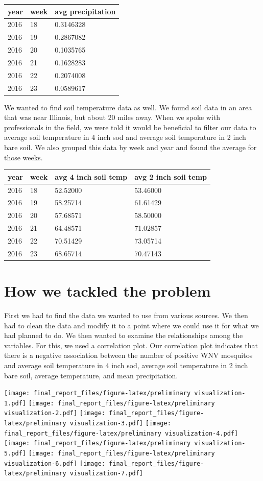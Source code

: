 \documentclass[]{article}
\begin{document}
\begin{longtable}[]{@{}lll@{}}
\toprule
year & week & avg precipitation\tabularnewline
\midrule
\endhead
2016 & 18 & 0.3146328\tabularnewline
2016 & 19 & 0.2867082\tabularnewline
2016 & 20 & 0.1035765\tabularnewline
2016 & 21 & 0.1628283\tabularnewline
2016 & 22 & 0.2074008\tabularnewline
2016 & 23 & 0.0589617\tabularnewline
\bottomrule
\end{longtable}

We wanted to find soil temperature data as well. We found soil data in
an area that was near Illinois, but about 20 miles away. When we spoke
with professionals in the field, we were told it would be beneficial to
filter our data to average soil temperature in 4 inch sod and average
soil temperature in 2 inch bare soil. We also grouped this data by week
and year and found the average for those weeks.

\begin{longtable}[]{@{}llll@{}}
\toprule
year & week & avg 4 inch soil temp & avg 2 inch soil temp\tabularnewline
\midrule
\endhead
2016 & 18 & 52.52000 & 53.46000\tabularnewline
2016 & 19 & 58.25714 & 61.61429\tabularnewline
2016 & 20 & 57.68571 & 58.50000\tabularnewline
2016 & 21 & 64.48571 & 71.02857\tabularnewline
2016 & 22 & 70.51429 & 73.05714\tabularnewline
2016 & 23 & 68.65714 & 70.47143\tabularnewline
\bottomrule
\end{longtable}

\hypertarget{how-we-tackled-the-problem}{%
\section{How we tackled the problem}\label{how-we-tackled-the-problem}}

First we had to find the data we wanted to use from various sources. We
then had to clean the data and modify it to a point where we could use
it for what we had planned to do. We then wanted to examine the
relationships among the variables. For this, we used a correlation plot.
Our correlation plot indicates that there is a negative association
between the number of positive WNV mosquitos and average soil
temperature in 4 inch sod, average soil temperature in 2 inch bare soil,
average temperature, and mean precipitation.

\texttt{[image: final\_report\_files/figure-latex/preliminary visualization-1.pdf]}
\texttt{[image: final\_report\_files/figure-latex/preliminary visualization-2.pdf]}
\texttt{[image: final\_report\_files/figure-latex/preliminary visualization-3.pdf]}
\texttt{[image: final\_report\_files/figure-latex/preliminary visualization-4.pdf]}
\texttt{[image: final\_report\_files/figure-latex/preliminary visualization-5.pdf]}
\texttt{[image: final\_report\_files/figure-latex/preliminary visualization-6.pdf]}
\texttt{[image: final\_report\_files/figure-latex/preliminary visualization-7.pdf]}
\end{document}
